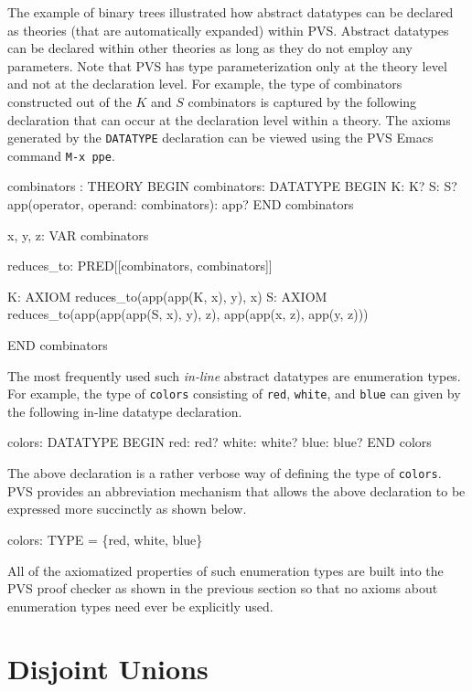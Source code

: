 \documentclass[11pt,twoside]{book}
\begin{document}
 The example of binary trees illustrated how abstract datatypes can be
declared as theories (that are automatically expanded) within PVS\@.
Abstract datatypes can be declared within other theories as long
as they do not employ any parameters.  Note that PVS  has
type parameterization only at the theory level and not at the declaration
level.   For example, the type of 
combinators constructed out of the $K$ and $S$ combinators is captured
by the following declaration that can occur at the declaration level
within a theory.   The axioms generated by the \texttt{DATATYPE} declaration
can be viewed using the PVS Emacs command \texttt{M-x
ppe}\@.  
\begin{session*}
combinators  : THEORY
  BEGIN
  combinators: DATATYPE
       BEGIN
         K: K?
         S: S?
         app(operator, operand: combinators): app?
       END combinators

  x, y, z: VAR combinators

  reduces_to: PRED[[combinators, combinators]]

  K: AXIOM reduces_to(app(app(K, x), y), x)
  S: AXIOM reduces_to(app(app(app(S, x), y), z), app(app(x, z), app(y, z)))

  END combinators
\end{session*}

The most frequently used such \emph{in-line} abstract datatypes are
enumeration types.  For example, the type of \texttt{colors} consisting of
\texttt{red}, \texttt{white}, and \texttt{blue} can given by the following
in-line datatype declaration.
\begin{session*}
  colors: DATATYPE
     BEGIN
       red: red?
       white: white?
       blue: blue?
     END colors
\end{session*}
  The above declaration is a rather verbose way
of defining the type of \texttt{colors}\@.  PVS provides an
abbreviation mechanism  that allows the above declaration to be
expressed more succinctly as shown below.
\begin{session*}
  colors: TYPE = \{red, white, blue\}
\end{session*}

All of the axiomatized properties of such enumeration types are built
into the PVS proof checker as shown  in the previous section so that
no axioms about enumeration types need ever be explicitly used.

\chapter{Disjoint Unions}\label{disjoint-union}
\end{document}
